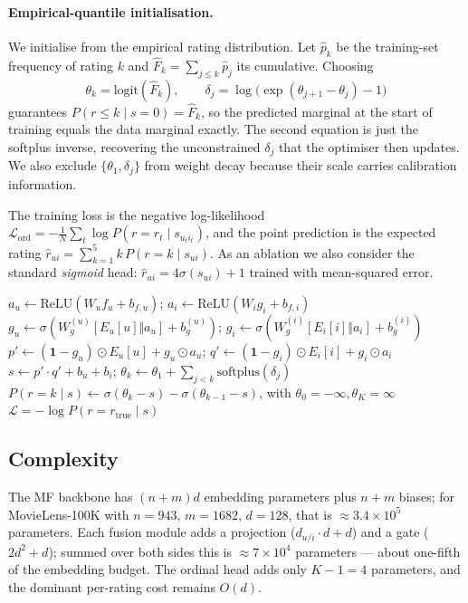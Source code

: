 \documentclass{article} %
\begin{document}
\paragraph{Empirical-quantile initialisation.}
We initialise from the empirical
rating distribution. Let $\hat p_k$ be the training-set frequency of rating
$k$ and $\hat F_k=\sum_{j\le k}\hat p_j$ its cumulative. Choosing
\begin{equation}
\label{eq:quantile-init}
\theta_k = \mathrm{logit}(\hat F_k),\qquad
\delta_j = \log\!\bigl(\exp(\theta_{j+1}-\theta_j) - 1\bigr)
\end{equation}
guarantees $P(r{\le}k\mid s{=}0)=\hat F_k$, so the predicted marginal at the
start of training equals the data marginal exactly. The second equation is
just the softplus inverse, recovering the unconstrained $\delta_j$ that the
optimiser then updates. We also exclude $\{\theta_1,\delta_j\}$ from weight
decay because their scale carries calibration information.

The training loss is the negative log-likelihood
$\mathcal{L}_{\mathrm{ord}}=-\frac{1}{N}\sum_t \log P(r=r_t\mid s_{u_ti_t})$,
and the point prediction is the expected rating
$\hat r_{ui}=\sum_{k=1}^{5}k\,P(r=k\mid s_{ui})$. As an ablation we also
consider the standard \emph{sigmoid} head:
$\hat r_{ui}=4\sigma(s_{ui})+1$ trained with mean-squared error.

\begin{algorithm}[ht]
\caption{Forward pass + ordinal NLL for one observed rating $(u,i,r)$.}
\label{alg:forward}
\begin{algorithmic}[1]
\State $a_u\!\gets\!\mathrm{ReLU}(W_u f_u {+}b_{f,u})$;\;
       $a_i\!\gets\!\mathrm{ReLU}(W_i g_i {+}b_{f,i})$
\State $g_u\!\gets\!\sigma(W_g^{(u)}[E_u[u]\Vert a_u]{+}b_g^{(u)})$;\;
       $g_i\!\gets\!\sigma(W_g^{(i)}[E_i[i]\Vert a_i]{+}b_g^{(i)})$
\State $p'\!\gets\!(\mathbf{1}{-}g_u)\!\odot\!E_u[u]+g_u\!\odot\! a_u$;\;
       $q'\!\gets\!(\mathbf{1}{-}g_i)\!\odot\!E_i[i]+g_i\!\odot\! a_i$
\State $s\!\gets\!p'\!\cdot\!q'+b_u+b_i$;\;
       $\theta_k\!\gets\!\theta_1+\sum_{j<k}\mathrm{softplus}(\delta_j)$
\State $P(r{=}k\mid s)\!\gets\!\sigma(\theta_k{-}s)-\sigma(\theta_{k-1}{-}s)$,\;
       with $\theta_0{=}-\infty,\theta_K{=}\infty$
\State \Return $\mathcal{L}=-\log P(r{=}r_{\text{true}}\mid s)$
\end{algorithmic}
\end{algorithm}

\subsection{Complexity}
\label{sec:complexity}
The MF backbone has $(n+m)d$ embedding parameters plus $n+m$ biases; for
MovieLens-100K with $n=943$, $m=1682$, $d=128$, that is $\approx 3.4\times10^5$
parameters. Each fusion module adds a projection ($d_{u/i}\cdot d + d$) and a gate
($2d^2+d$); summed over both sides this is $\approx 7\times10^4$ parameters
--- about one-fifth of the embedding budget. The ordinal head adds only
$K-1=4$ parameters, and the dominant per-rating cost remains $O(d)$.
\end{document}
